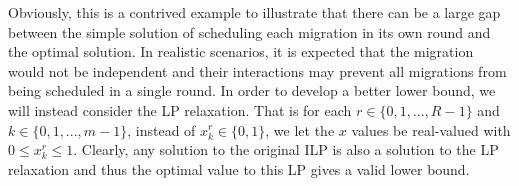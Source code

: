 \documentclass[letterpaper,12pt,titlepage,oneside,final]{article}
\begin{document}
Obviously, this is a contrived example to illustrate that there can be a large gap between the simple solution of scheduling each migration in its own round and the optimal solution. In realistic scenarios, it is expected that the migration would not be independent and their interactions may prevent all migrations from being scheduled in a single round. In order to develop a better lower bound, we will instead consider the LP relaxation. That is for each $r \in \{0, 1, ..., R - 1\}$ and $k \in \{0, 1, ..., m - 1\}$, instead of $x^{r}_{k} \in \{0, 1\}$, we let the $x$ values be real-valued with $0 \leq x^{r}_{k} \leq 1$. Clearly, any solution to the original ILP is also a solution to the LP relaxation and thus the optimal value to this LP gives a valid lower bound.
 
\newpage



\end{document}
